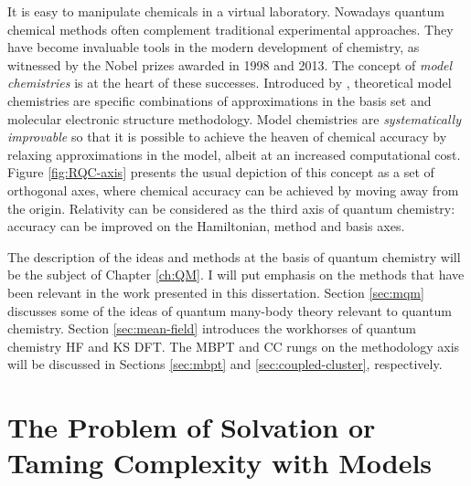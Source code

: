 It is easy to manipulate chemicals in a virtual laboratory. Nowadays
quantum chemical methods often complement traditional experimental
approaches. They have become invaluable tools in the modern development
of chemistry,\autocite{Lee1995-pw, Helgaker2004-oz, Tajti2004-ye} as
witnessed by the Nobel prizes awarded in 1998\autocite{Nobel1998} and
2013.\autocite{Nobel2013}
The concept of \emph{model chemistries} is at the heart of these
successes. Introduced by \citeauthor{Pople1999-gt}, theoretical model
chemistries are specific combinations of approximations in the basis set
and molecular electronic structure methodology.\autocite{Pople1999-gt}
Model chemistries are \emph{systematically improvable} so that it is
possible to achieve the heaven of chemical accuracy by relaxing
approximations in the model, albeit at an increased computational cost.
Figure \ref{fig:RQC-axis} presents the usual depiction of this concept
as a set of orthogonal axes, where chemical accuracy can be achieved by
moving away from the origin.
Relativity can be considered as the third axis of quantum
chemistry: accuracy can be improved on the Hamiltonian, method
and basis axes.\autocite{Saue2011-qg}

The description of the ideas and methods at the basis of quantum
chemistry will be the subject of Chapter \ref{ch:QM}.
I will put emphasis on the methods that have been relevant in the work
presented in this dissertation. Section \ref{sec:mqm} discusses some of the
ideas of quantum many-body theory relevant to quantum chemistry. Section
\ref{sec:mean-field} introduces the workhorses of quantum chemistry
\acrlong*{HF} and \acrlong*{KS} \acrlong*{DFT}.
The \acrlong*{MBPT} and \acrlong*{CC} rungs on the methodology axis will
be discussed in Sections \ref{sec:mbpt} and \ref{sec:coupled-cluster},
respectively.

\section*{The Problem of Solvation or Taming Complexity with Models}

